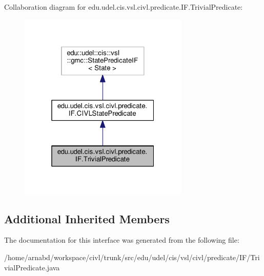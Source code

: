 Collaboration diagram for edu.\+udel.\+cis.\+vsl.\+civl.\+predicate.\+I\+F.\+Trivial\+Predicate\+:
\nopagebreak
\begin{figure}[H]
\begin{center}
\leavevmode
\includegraphics[width=229pt]{interfaceedu_1_1udel_1_1cis_1_1vsl_1_1civl_1_1predicate_1_1IF_1_1TrivialPredicate__coll__graph}
\end{center}
\end{figure}
\subsection*{Additional Inherited Members}


The documentation for this interface was generated from the following file\+:\begin{DoxyCompactItemize}
\item 
/home/arnabd/workspace/civl/trunk/src/edu/udel/cis/vsl/civl/predicate/\+I\+F/Trivial\+Predicate.\+java\end{DoxyCompactItemize}
